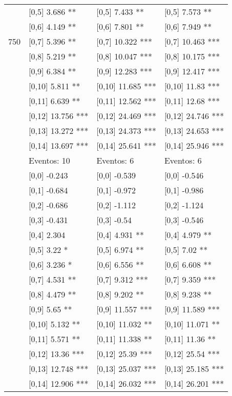 \begin{table}
\begin{tabular}[t]{llll}
 & {}[0,5] 3.686 ** & {}[0,5] 7.433 ** & {}[0,5] 7.573 **\\
 & {}[0,6] 4.149 ** & {}[0,6] 7.801 ** & {}[0,6] 7.949 **\\
750 & {}[0,7] 5.396 ** & {}[0,7] 10.322 *** & {}[0,7] 10.463 ***\\
\addlinespace
 & {}[0,8] 5.219 ** & {}[0,8] 10.047 *** & {}[0,8] 10.175 ***\\
 & {}[0,9] 6.384 ** & {}[0,9] 12.283 *** & {}[0,9] 12.417 ***\\
 & {}[0,10] 5.811 ** & {}[0,10] 11.685 *** & {}[0,10] 11.83 ***\\
 & {}[0,11] 6.639 ** & {}[0,11] 12.562 *** & {}[0,11] 12.68 ***\\
 & {}[0,12] 13.756 *** & {}[0,12] 24.469 *** & {}[0,12] 24.746 ***\\
\addlinespace
 & {}[0,13] 13.272 *** & {}[0,13] 24.373 *** & {}[0,13] 24.653 ***\\
 & {}[0,14] 13.697 *** & {}[0,14] 25.641 *** & {}[0,14] 25.946 ***\\
 & Eventos:  10 & Eventos:  6 & Eventos:  6\\
 & {}[0,0] -0.243 & {}[0,0] -0.539 & {}[0,0] -0.546\\
 & {}[0,1] -0.684 & {}[0,1] -0.972 & {}[0,1] -0.986\\
\addlinespace
 & {}[0,2] -0.686 & {}[0,2] -1.112 & {}[0,2] -1.124\\
 & {}[0,3] -0.431 & {}[0,3] -0.54 & {}[0,3] -0.546\\
 & {}[0,4] 2.304 & {}[0,4] 4.931 ** & {}[0,4] 4.979 **\\
 & {}[0,5] 3.22 * & {}[0,5] 6.974 ** & {}[0,5] 7.02 **\\
 & {}[0,6] 3.236 * & {}[0,6] 6.556 ** & {}[0,6] 6.608 **\\
\addlinespace
1000 & {}[0,7] 4.531 ** & {}[0,7] 9.312 *** & {}[0,7] 9.359 ***\\
 & {}[0,8] 4.479 ** & {}[0,8] 9.202 ** & {}[0,8] 9.238 **\\
 & {}[0,9] 5.65 ** & {}[0,9] 11.557 *** & {}[0,9] 11.589 ***\\
 & {}[0,10] 5.132 ** & {}[0,10] 11.032 ** & {}[0,10] 11.071 **\\
 & {}[0,11] 5.571 ** & {}[0,11] 11.338 ** & {}[0,11] 11.36 **\\
\addlinespace
 & {}[0,12] 13.36 *** & {}[0,12] 25.39 *** & {}[0,12] 25.54 ***\\
 & {}[0,13] 12.748 *** & {}[0,13] 25.037 *** & {}[0,13] 25.185 ***\\
 & {}[0,14] 12.906 *** & {}[0,14] 26.032 *** & {}[0,14] 26.201 ***\\
\bottomrule
\end{tabular}
\end{table}
